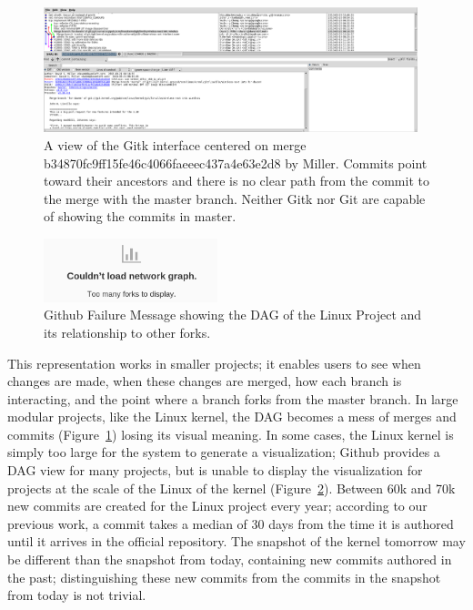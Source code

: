 \documentclass[draft]{IEEEtran}
\begin{document}
\begin{figure}
        \centering
        \includegraphics[width=0.97\textwidth]{figures/gitk.png}
        \caption{A view of the Gitk interface centered on merge
          b34870fc9ff15fe46c4066faeeec437a4e63e2d8 by Miller. Commits point toward
          their ancestors and there is no clear path from the commit to the merge
          with the master branch. Neither Gitk nor Git are capable of showing the
          commits in master.}
        \label{fig:gitk}
\end{figure}


\begin{figure}
        \centering
        \includegraphics[width=0.45\textwidth]{figures/github_viewer.png}
        \caption{Github Failure Message showing the DAG of the Linux Project and its
                relationship to other forks.}
        \label{fig:gitfail}
\end{figure}


This representation works in smaller projects; it enables users to see
when changes are made, when these changes are merged, how each branch is
interacting, and the point where a branch forks from the master branch.
In large modular projects, like the Linux kernel, the DAG becomes a mess
of merges and commits (Figure~\ref{fig:gitk}) losing its visual meaning.
In some cases, the Linux kernel is simply too large for the system to
generate a visualization; Github provides a DAG view for many projects,
but is unable to display the visualization for projects at the scale of
the Linux of the kernel (Figure~\ref{fig:gitfail}).  Between 60k and 70k
new commits are created for the Linux project every year; according to
our previous work\cite{German2015}, a commit takes a median of 30 days
from the time it is authored until it arrives in the official
repository. The snapshot of the kernel tomorrow may be different than
the snapshot from today, containing new commits authored in the past;
distinguishing these new commits from the commits in the snapshot from
today is not trivial.
\end{document}
